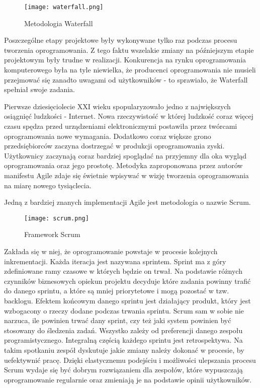 \begin{figure}[htbp]
    \centering
    \texttt{[image: waterfall.png]}
    \caption{Metodologia Waterfall}
    \label{fig:waterfall}
\end{figure}
Poszczególne etapy projektowe były wykonywane tylko raz podczas procesu tworzenia oprogramowania. Z tego faktu wszelakie zmiany na późniejszym etapie projektowym były trudne w realizacji. Konkurencja na rynku oprogramowania komputerowego była na tyle niewielka, że producenci oprogramowania nie musieli przejmować się zanadto uwagami od użytkowników - to sprawiało, że Waterfall spełniał swoje zadania. 
\par
Pierwsze dziesięciolecie XXI wieku spopularyzowało jedno z największych osiągnięć ludzkości - Internet. Nowa rzeczywistość w której ludzkość coraz więcej czasu spędza przed urządzeniami elektronicznymi postawiła przez twórcami oprogramowania nowe wymagania. Dodatkowo coraz większe grono przedsiębiorców zaczyna dostrzegać w produkcji oprogramowania zyski. Użytkownicy zaczynają coraz bardziej spoglądać na przyjemny dla oka wygląd oprogramowania oraz jego prostotę. Metodyka zaproponowana przez autorów manifestu Agile zdaje się świetnie wpisywać w wizję tworzenia oprogramowania na miarę nowego tysiąclecia.
\par
Jedną z bardziej znanych implementacji Agile jest metodologia o nazwie Scrum.
\begin{figure}[htbp]
    \centering
    \texttt{[image: scrum.png]}
    \caption{Framework Scrum}
    \label{fig:scrum}
\end{figure}
Zakłada się w niej, że oprogramowanie powstaje w procesie kolejnych inkrementacji. Każda iteracja jest nazywana sprintem. Sprint ma z góry zdefiniowane ramy czasowe w których będzie on trwał. Na podstawie różnych czynników biznesowych opiekun projektu decyduje które zadania powinny trafić do danego sprintu, a które są mniej priorytetowe i mogą pozostać w tzw. backlogu. Efektem końcowym danego sprintu jest działający produkt, który jest wzbogacony o rzeczy dodane podczas trwania sprintu. Scrum sam w sobie nie narzuca, ile powinien trwać dany sprint, czy też jaki system powinien być stosowany do śledzenia zadań. Wszystko zależy od preferencji danego zespołu programistycznego. Integralną częścią każdego sprintu jest retrospektywa. Na takim spotkaniu zespół dyskutuje jakie zmiany należy dokonać w procesie, by uefektywnić pracę. Dzięki elastycznemu podejściu i możliwości ulepszania procesu Scrum wydaje się być dobrym rozwiązaniem dla zespołów, które wypuszczają oprogramowanie regularnie oraz zmieniają je na podstawie opinii użytkowników.
